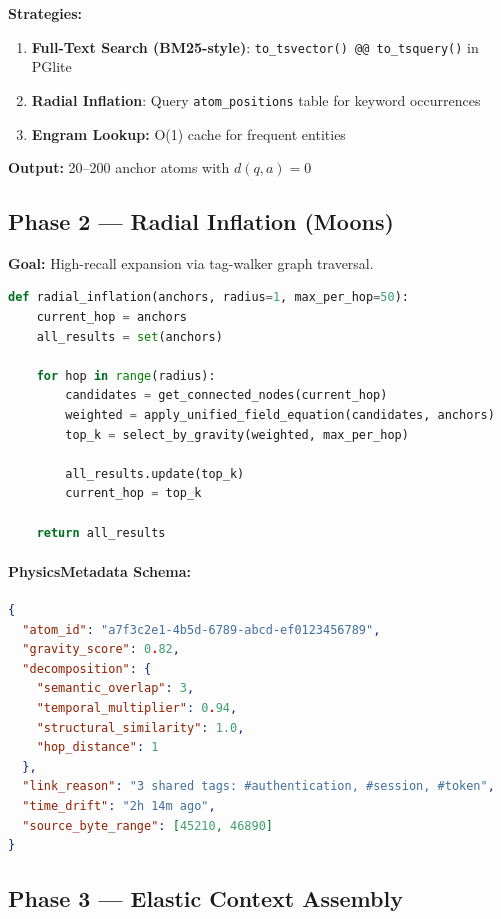 \documentclass[11pt]{article}
\begin{document}
\textbf{Strategies:}
\begin{enumerate}
    \item \textbf{Full-Text Search (BM25-style)}: \texttt{to\_tsvector() @@ to\_tsquery()} in PGlite
    \item \textbf{Radial Inflation}: Query \texttt{atom\_positions} table for keyword occurrences
    \item \textbf{Engram Lookup:} O(1) cache for frequent entities
\end{enumerate}

\textbf{Output:} 20--200 anchor atoms with $d(q,a) = 0$

\subsection{Phase 2 --- Radial Inflation (Moons)}

\textbf{Goal:} High-recall expansion via tag-walker graph traversal.

\begin{lstlisting}[language=Python, caption={Radial Inflation Algorithm}]
def radial_inflation(anchors, radius=1, max_per_hop=50):
    current_hop = anchors
    all_results = set(anchors)
    
    for hop in range(radius):
        candidates = get_connected_nodes(current_hop)
        weighted = apply_unified_field_equation(candidates, anchors)
        top_k = select_by_gravity(weighted, max_per_hop)
        
        all_results.update(top_k)
        current_hop = top_k
    
    return all_results
\end{lstlisting}

\paragraph{PhysicsMetadata Schema:}
\begin{lstlisting}[language=JSON, caption={PhysicsMetadata JSON Schema}]
{
  "atom_id": "a7f3c2e1-4b5d-6789-abcd-ef0123456789",
  "gravity_score": 0.82,
  "decomposition": {
    "semantic_overlap": 3,
    "temporal_multiplier": 0.94,
    "structural_similarity": 1.0,
    "hop_distance": 1
  },
  "link_reason": "3 shared tags: #authentication, #session, #token",
  "time_drift": "2h 14m ago",
  "source_byte_range": [45210, 46890]
}
\end{lstlisting}

\subsection{Phase 3 --- Elastic Context Assembly}
\end{document}
